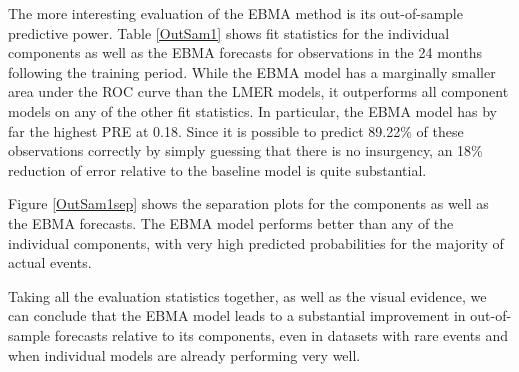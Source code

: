 \documentclass[pdftex,12pt,fullpage,oneside]{amsart}
\begin{document}
The more interesting evaluation of the EBMA method is its
out-of-sample predictive power. Table \ref{OutSam1} shows fit
statistics for the individual components as well as the EBMA forecasts
for observations in the 24 months following the training period.
While the EBMA model has a marginally smaller area under the ROC curve
than the LMER models, it outperforms all component models on any of
the other fit statistics. In particular, the EBMA model has by far the
highest PRE at 0.18.  Since it is possible to predict 89.22\% of these
observations correctly by simply guessing that there is no insurgency,
an 18\% reduction of error relative to the baseline model is quite
substantial.


Figure \ref{OutSam1sep} shows the separation plots for the components
as well as the EBMA forecasts.  The EBMA model performs better than
any of the individual components, with very high predicted
probabilities for the majority of actual events. 

Taking all the evaluation statistics together, as well as the visual
evidence, we can conclude that the EBMA model leads to a substantial
improvement in out-of-sample forecasts relative to its components, even
in datasets with rare events and when individual models are already
performing very well.
\end{document}
